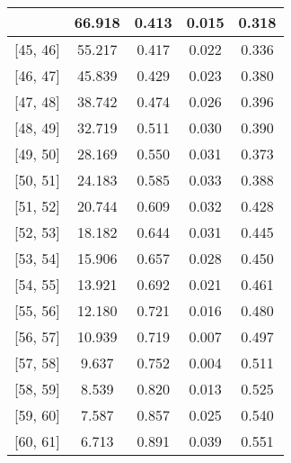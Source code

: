 \documentclass[12pt]{article}
\begin{document}
\begin{table}[]
\begin{tabular}{c|c|c|c|c|}
{\multicolumn{1}{|c|}{{[}44,  45{]}}  & 66.918 & 0.413 & 0.015 & 0.318 \\ \hline 
\multicolumn{1}{|c|}{{[}45,  46{]}}  & 55.217 & 0.417 & 0.022 & 0.336 \\ \hline 
\multicolumn{1}{|c|}{{[}46,  47{]}}  & 45.839 & 0.429 & 0.023 & 0.380 \\ \hline 
\multicolumn{1}{|c|}{{[}47,  48{]}}  & 38.742 & 0.474 & 0.026 & 0.396 \\ \hline 
\multicolumn{1}{|c|}{{[}48,  49{]}}  & 32.719 & 0.511 & 0.030 & 0.390 \\ \hline 
\multicolumn{1}{|c|}{{[}49,  50{]}}  & 28.169 & 0.550 & 0.031 & 0.373 \\ \hline 
\multicolumn{1}{|c|}{{[}50,  51{]}}  & 24.183 & 0.585 & 0.033 & 0.388 \\ \hline 
\multicolumn{1}{|c|}{{[}51,  52{]}}  & 20.744 & 0.609 & 0.032 & 0.428 \\ \hline 
\multicolumn{1}{|c|}{{[}52,  53{]}}  & 18.182 & 0.644 & 0.031 & 0.445 \\ \hline 
\multicolumn{1}{|c|}{{[}53,  54{]}}  & 15.906 & 0.657 & 0.028 & 0.450 \\ \hline 
\multicolumn{1}{|c|}{{[}54,  55{]}}  & 13.921 & 0.692 & 0.021 & 0.461 \\ \hline 
\multicolumn{1}{|c|}{{[}55,  56{]}}  & 12.180 & 0.721 & 0.016 & 0.480 \\ \hline 
\multicolumn{1}{|c|}{{[}56,  57{]}}  & 10.939 & 0.719 & 0.007 & 0.497 \\ \hline 
\multicolumn{1}{|c|}{{[}57,  58{]}}  & 9.637 & 0.752 & 0.004 & 0.511 \\ \hline 
\multicolumn{1}{|c|}{{[}58,  59{]}}  & 8.539 & 0.820 & 0.013 & 0.525 \\ \hline 
\multicolumn{1}{|c|}{{[}59,  60{]}}  & 7.587 & 0.857 & 0.025 & 0.540 \\ \hline 
\multicolumn{1}{|c|}{{[}60,  61{]}}  & 6.713 & 0.891 & 0.039 & 0.551 \\ \hline 
\end{tabular}
\end{table}
\end{document}
